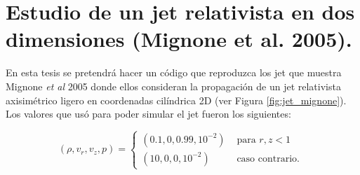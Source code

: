 \documentclass[12pt,a4paper]{book}
\begin{document}
\section{Estudio de un jet relativista en dos dimensiones (Mignone et al. 2005).}
En esta tesis se pretendrá hacer un código que reproduzca los jet que muestra Mignone \emph{et al} 2005 \cite{MB-HLLC-I} donde ellos consideran la propagación de un jet relativista axisimétrico ligero en 
coordenadas cilíndrica 2D (ver Figura \ref{fig:jet_mignone}). Los valores que usó para poder simular el jet fueron los siguientes:

\begin{equation}
  \left(\rho, v_{r}, v_{z}, p\right)=\left\{\begin{array}{ll}
  \left(0.1,0,0.99,10^{-2}\right) & \text { para } r, z<1 \\
  \left(10,0,0,10^{-2}\right) & \text { caso contrario. }
  \end{array}\right.
\end{equation}
\end{document}
